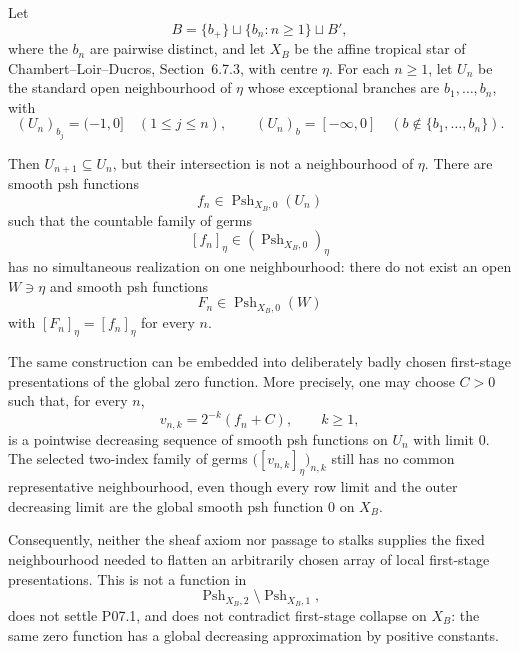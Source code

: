 
Let
\[
             B=\{b_+\}\sqcup\{b_n:n\geq1\}\sqcup B',
\]
where the \(b_n\) are pairwise distinct, and let \(X_B\) be the affine
tropical star of Chambert--Loir--Ducros, Section~6.7.3, with centre
\(\eta\). For each \(n\geq1\), let \(U_n\) be the standard open
neighbourhood of \(\eta\) whose exceptional branches are
\(b_1,\ldots,b_n\), with
\[
 (U_n)_{b_j}=(-1,0]\quad(1\leq j\leq n),
 \qquad
 (U_n)_b=[-\infty,0]\quad
       (b\notin\{b_1,\ldots,b_n\}).
\]

Then \(U_{n+1}\subseteq U_n\), but their intersection is not a
neighbourhood of \(\eta\). There are smooth psh functions
\[
                  f_n\in\operatorname{Psh}_{X_B,0}(U_n)
\]
such that the countable family of germs
\[
                         [f_n]_\eta\in
                 (\operatorname{Psh}_{X_B,0})_\eta
\]
has no simultaneous realization on one neighbourhood: there do not exist
an open \(W\ni\eta\) and smooth psh functions
\[
                  F_n\in\operatorname{Psh}_{X_B,0}(W)
\]
with \([F_n]_\eta=[f_n]_\eta\) for every \(n\).

The same construction can be embedded into deliberately badly chosen
first-stage presentations of the global zero function. More precisely, one
may choose \(C>0\) such that, for every \(n\),
\[
                         v_{n,k}=2^{-k}(f_n+C),
                         \qquad k\geq1,
\]
is a pointwise decreasing sequence of smooth psh functions on \(U_n\)
with limit \(0\). The selected two-index family of germs
\(\bigl([v_{n,k}]_\eta\bigr)_{n,k}\) still has no common representative
neighbourhood, even though every row limit and the outer decreasing limit
are the global smooth psh function \(0\) on \(X_B\).

Consequently, neither the sheaf axiom nor passage to stalks supplies the
fixed neighbourhood needed to flatten an arbitrarily chosen array of local
first-stage presentations. This is not a function in
\[
 \operatorname{Psh}_{X_B,2}\setminus\operatorname{Psh}_{X_B,1},
\]
does not settle P07.1, and does not contradict first-stage collapse on
\(X_B\): the same zero function has a global decreasing approximation by
positive constants.
